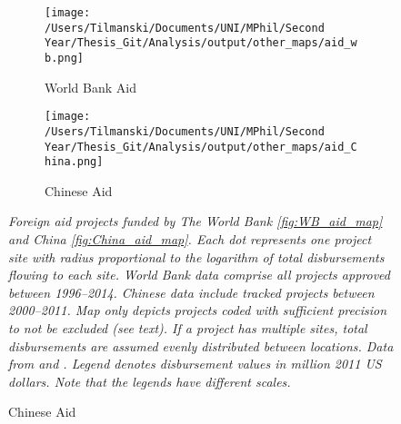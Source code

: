 \documentclass[11pt, oneside]{article}   	%
\newcommand{\mysubcaption}[1]{
\justify
\begin{spacing}{0.7}
\textit{\footnotesize #1}
\end{spacing}}
\begin{document}
\begin{figure}[t]
\centering
\caption{Spatial Distribution of Development Aid Projects to African Nations}

\begin{subfigure}[c]{0.48\textwidth}
\texttt{[image: /Users/Tilmanski/Documents/UNI/MPhil/Second Year/Thesis\_Git/Analysis/output/other\_maps/aid\_wb.png]}
\caption{World Bank Aid}
\label{fig:WB_aid_map}
\end{subfigure}
\begin{subfigure}[c]{0.48\textwidth}
\texttt{[image: /Users/Tilmanski/Documents/UNI/MPhil/Second Year/Thesis\_Git/Analysis/output/other\_maps/aid\_China.png]}
\caption{Chinese Aid}
\label{fig:China_aid_map}
\end{subfigure}

\label{fig:Aid_maps}
\mysubcaption{Foreign aid projects funded by The World Bank \eqref{fig:WB_aid_map} and China \eqref{fig:China_aid_map}. Each dot represents one project site with radius proportional to the logarithm of total disbursements flowing to each site. World Bank data comprise all projects approved between 1996--2014. Chinese data include tracked projects between 2000--2011. Map only depicts projects coded with sufficient precision to not be excluded (see text). If a project has multiple sites, total disbursements are assumed evenly distributed between locations. Data from \cite{AidData_WorldBankGeocoded_2017} and \cite{Strange_TrackingUnderreportedFinancial_2017}. Legend denotes disbursement values in million 2011 US dollars. Note that the legends have different scales.}
\end{figure}
\end{document}
